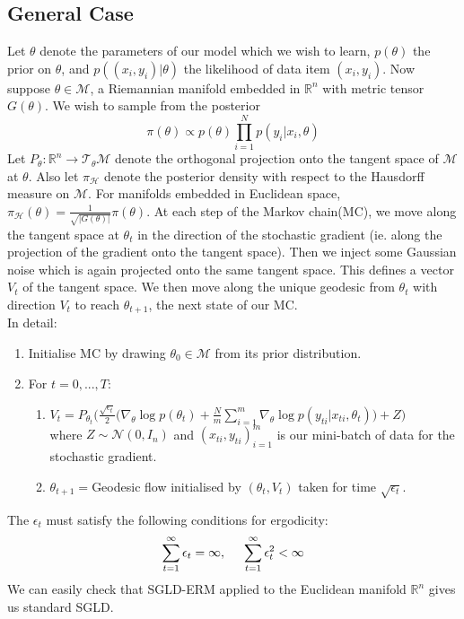\documentclass[a4paper,10pt]{article}
\begin{document}
\subsection{General Case}
Let $\theta$ denote the parameters of our model which we wish to learn, $p(\theta)$ the prior on $\theta$, and $p((x_i,y_i)|\theta)$ the likelihood of data item $(x_i,y_i)$. Now suppose $\theta \in \mathcal{M}$, a Riemannian manifold embedded in $\mathbb{R}^n$ with metric tensor $G(\theta)$. We wish to sample from the posterior
\begin{equation}
\pi(\theta) \propto p(\theta)\prod_{i=1}^N p(y_i|x_i,\theta)
\end{equation}
Let $P_{\theta}: \mathbb{R}^n \rightarrow \mathcal{T}_{\theta}\mathcal{M}$ denote the orthogonal projection onto the tangent space of $\mathcal{M}$ at $\theta$. Also let $\pi_{\mathcal{H}}$ denote the posterior density with respect to the Hausdorff measure on $\mathcal{M}$. For manifolds embedded in Euclidean space, $\pi_{\mathcal{H}}(\theta)=\frac{1}{\sqrt{|G(\theta)|}}\pi(\theta)$.
At each step of the Markov chain(MC), we move along the tangent space at $\theta_t$ in the direction of the stochastic gradient (ie. along the projection of the gradient onto the tangent space). Then we inject some Gaussian noise which is again projected onto the same tangent space. This defines a vector $V_t$ of the tangent space. We then move along the unique geodesic from $\theta_t$ with direction $V_t$ to reach $\theta_{t+1}$, the next state of our MC. \\
In detail:
\begin{enumerate}
\item Initialise MC by drawing $\theta_0 \in \mathcal{M}$ from its prior distribution. 
\item For $t=0,...,T$:
\begin{enumerate}
\item $V_t = P_{\theta_t}\bigg(\frac{\sqrt{\epsilon_t}}{2}\Big(\nabla_{\theta}\log p(\theta_t)+\frac{N}{m}\sum_{i=1}^m \nabla_{\theta}\log p(y_{ti}|x_{ti},\theta_t)\Big) +Z \bigg)$ \\ where $Z \sim \mathcal{N}(0,I_n)$ and $(x_{ti},y_{ti})_{i=1}^m$ is our mini-batch of data for the stochastic gradient.
\item $\theta_{t+1}=$Geodesic flow initialised by $(\theta_t,V_t)$ taken for time $\sqrt{\epsilon_t}$.
\end{enumerate}
\end{enumerate}
The $\epsilon_t$ must satisfy the following conditions for ergodicity:
\begin{equation}
\sum_{t=1}^{\infty} \epsilon_t = \infty , \hspace{5mm} \sum_{t=1}^{\infty} \epsilon_t^2 < \infty
\end{equation}
We can easily check that SGLD-ERM applied to the Euclidean manifold $\mathbb{R}^n$ gives us standard SGLD.
\end{document}
